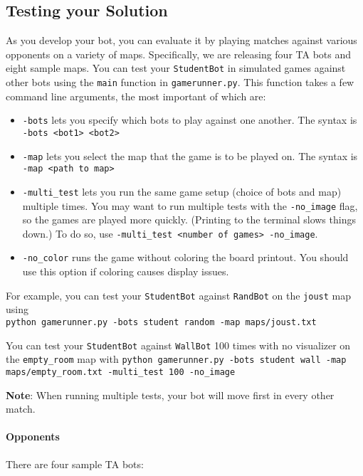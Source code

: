 \documentclass{article}
\begin{document}
\subsection{Testing your Solution}
As you develop your bot, you can evaluate it by playing matches
against various opponents on a variety of maps.  Specifically, we are
releasing four TA bots and eight sample maps.
%
You can test your \texttt{StudentBot} in simulated games against other
bots using the \texttt{main} function in \texttt{gamerunner.py}.  This
function takes a few command line arguments, the most important of
which are:

\begin{itemize}
\item \texttt{-bots} lets you specify which bots to play against one another. The syntax is \texttt{-bots <bot1> <bot2>}

\item \texttt{-map} lets you select the map that the game is to be played on. The syntax is \texttt{-map <path to map>}

\item \texttt{-multi\_test} lets you run the same game setup (choice of bots and map) multiple times.
  You may want to run multiple tests with the \texttt{-no\_image} flag, so the games are played more quickly.
  (Printing to the terminal slows things down.)
  To do so, use \texttt{-multi\_test <number of games> -no\_image}.

\item \texttt{-no\_color} runs the game without coloring the board printout.
  You should use this option if coloring causes display issues.
\end{itemize}

For example, you can test your \texttt{StudentBot} against \texttt{RandBot} on the \texttt{joust} map using \\
\texttt{python gamerunner.py -bots student random -map maps/joust.txt}

You can test your \texttt{StudentBot} against \texttt{WallBot} 100 times with no visualizer on the \texttt{empty\_room} map with
\texttt{python gamerunner.py -bots student wall -map maps/empty\_room.txt -multi\_test 100 -no\_image}

\textbf{Note}: When running multiple tests, your bot will move first in every other match.


\paragraph{Opponents}
There are four sample TA bots:
\end{document}
